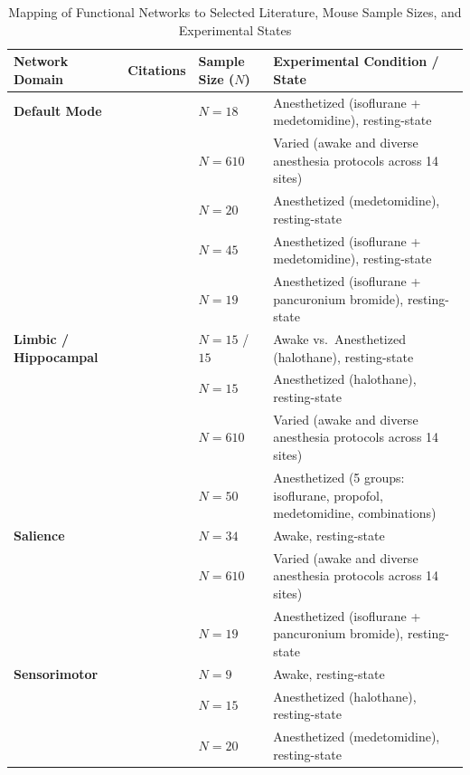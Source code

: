 \begin{table}[htbp]
\centering
\caption{Mapping of Functional Networks to Selected Literature, Mouse Sample Sizes, and Experimental States}
\label{tab:fmri_networks}
\small
\begin{tabularx}{\textwidth}{l l l X}
\toprule
\textbf{Network Domain} & \textbf{Citations} & \textbf{Sample Size ($N$)} & \textbf{Experimental Condition / State} \\
\midrule
\textbf{Default Mode} 
  & \cite{whitesell2021regional} & $N = 18$ & Anesthetized (isoflurane + medetomidine), resting-state \\
  & \cite{fmri_Grandjean2020} & $N = 610$ & Varied (awake and diverse anesthesia protocols across 14 sites) \\
  & \cite{fmri_Zerbi2015} & $N = 20$ & Anesthetized (medetomidine), resting-state \\
  & \cite{fmri_Grandjean2017} & $N = 45$ & Anesthetized (isoflurane + medetomidine), resting-state \\
  & \cite{fmri_Vafaii2024} & $N = 19$ & Anesthetized (isoflurane + pancuronium bromide), resting-state \\
\midrule
\textbf{Limbic / Hippocampal} 
  & \cite{fmri_Gutierrez-Barragan2022} & $N = 15$ / $15$ & Awake vs.\ Anesthetized (halothane), resting-state \\
  & \cite{fmri_Sforazzini2014} & $N = 15$ & Anesthetized (halothane), resting-state \\
  & \cite{fmri_Grandjean2020} & $N = 610$ & Varied (awake and diverse anesthesia protocols across 14 sites) \\
  & \cite{fmri_Bukhari2017} & $N = 50$ & Anesthetized (5 groups: isoflurane, propofol, medetomidine, combinations) \\
\midrule
\textbf{Salience} 
  & \cite{fmri_Tsurugizawa2020} & $N = 34$ & Awake, resting-state \\
  & \cite{fmri_Grandjean2020} & $N = 610$ & Varied (awake and diverse anesthesia protocols across 14 sites) \\
  & \cite{fmri_Vafaii2024} & $N = 19$ & Anesthetized (isoflurane + pancuronium bromide), resting-state \\
\midrule
\textbf{Sensorimotor} 
  & \cite{hike2025high} & $N = 9$ & Awake, resting-state \\
  & \cite{fmri_Sforazzini2014} & $N = 15$ & Anesthetized (halothane), resting-state \\
  & \cite{fmri_Zerbi2015} & $N = 20$ & Anesthetized (medetomidine), resting-state \\

\end{tabularx}
\end{table}
